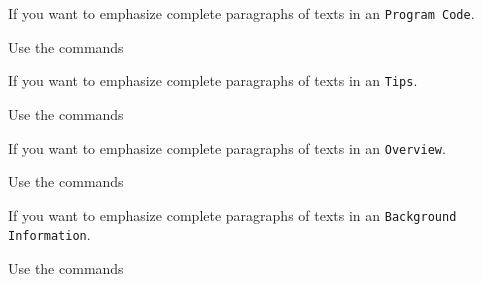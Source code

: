 \documentclass[graybox,square]{svmono}
\begin{document}
\begin{sloppy}
If you want to emphasize complete paragraphs of texts in an \verb|Program Code|.  

Use the commands

\cprotect{}

If you want to emphasize complete paragraphs of texts in an \verb|Tips|.  



Use the commands

\cprotect{}

If you want to emphasize complete paragraphs of texts in an \verb|Overview|.  

Use the commands

\cprotect{}

If you want to emphasize complete paragraphs of texts in an \verb|Background| \verb|Information|.  


Use the commands

\cprotect{}


\end{sloppy}
\end{document}
